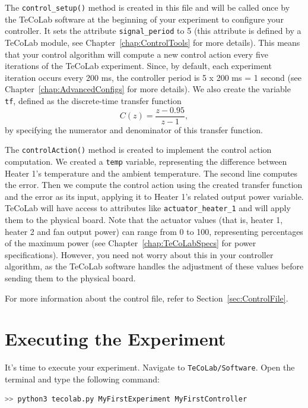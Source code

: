 \documentclass[12pt]{report}
\begin{document}
The \texttt{control\_setup()} method is created in this file and will be called once by the TeCoLab software at the beginning of your experiment to configure your controller. It sets the attribute \texttt{signal\_period} to 5 (this attribute is defined by a TeCoLab module, see Chapter~\ref{chap:ControlTools} for more details). This means that your control algorithm will compute a new control action every five iterations of the TeCoLab experiment. Since, by default, each experiment iteration occurs every 200 ms, the controller period is 5 x 200 ms = 1 second (see Chapter~\ref{chap:AdvancedConfigs} for more details). We also create the variable \texttt{tf}, defined as the discrete-time transfer function
\begin{equation*}
C(z) = \frac{z - 0.95}{z - 1},
\end{equation*}
by specifying the numerator and denominator of this transfer function.

The \texttt{controlAction()} method is created to implement the control action computation. We created a \texttt{temp} variable, representing the difference between Heater 1's temperature and the ambient temperature. The second line computes the error. Then we compute the control action using the created transfer function and the error as its input, applying it to Heater 1's related output power variable. TeCoLab will have access to attributes like \texttt{actuator\_heater\_1} and will apply them to the physical board. Note that the actuator values (that is, heater 1, heater 2 and fan output power) can range from 0 to 100, representing percentages of the maximum power (see Chapter~\ref{chap:TeCoLabSpecs} for power specifications). However, you need not worry about this in your controller algorithm, as the TeCoLab software handles the adjustment of these values before sending them to the physical board.

For more information about the control file, refer to Section~\ref{sec:ControlFile}.

\section{Executing the Experiment}

It's time to execute your experiment. Navigate to \texttt{TeCoLab/Software}. Open the terminal and type the following command:

\begin{lstlisting}[language=bash]
>> python3 tecolab.py MyFirstExperiment MyFirstController
\end{lstlisting}
\end{document}
